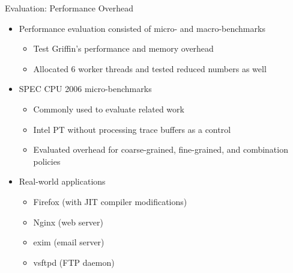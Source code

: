\documentclass[12pt, dvipsnames, aspectratio=169]{beamer}
\begin{document}
\begin{frame}[c]{Evaluation: Performance Overhead}{}
  \begin{itemize}
    \item Performance evaluation consisted of micro- and macro-benchmarks
    \begin{itemize}
      \item Test Griffin's performance and memory overhead
      \item Allocated 6 worker threads and tested reduced numbers as well
    \end{itemize}

    \vfill
    \item SPEC CPU 2006 micro-benchmarks
    \begin{itemize}
      \item Commonly used to evaluate related work
      \item Intel PT without processing trace buffers as a control
      \item Evaluated overhead for coarse-grained, fine-grained, and combination policies
    \end{itemize}

    \vfill
    \item Real-world applications
    \begin{itemize}
      \item Firefox (with JIT compiler modifications)
      \item Nginx (web server)
      \item exim (email server)
      \item vsftpd (FTP daemon)
    \end{itemize}
  \end{itemize}
\end{frame}
\end{document}
